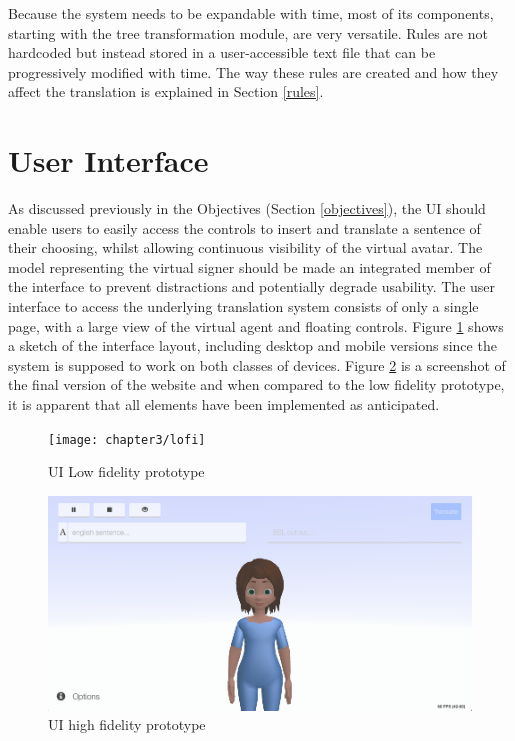 \documentclass[12pt]{ociamthesis}  %
\begin{document}
Because the system needs to be expandable with time, most of its components, starting with the tree transformation module, are very versatile. Rules are not hardcoded but instead stored in a user-accessible text file that can be progressively modified with time. The way these rules are created and how they affect the translation is explained in Section \ref{rules}.

\section{User Interface}
\label{UI}
As discussed previously in the Objectives (Section \ref{objectives}), the UI should enable users to easily access the controls to insert and translate a sentence of their choosing, whilst allowing continuous visibility of the virtual avatar. The model representing the virtual signer should be made an integrated member of the interface to prevent distractions and potentially degrade usability. The user interface to access the underlying translation system consists of only a single page, with a large view of the virtual agent and floating controls. Figure \ref{fig:lofi} shows a sketch of the interface layout, including desktop and mobile versions since the system is supposed to work on both classes of devices. Figure \ref{fig:hififull} is a screenshot of the final version of the website and when compared to the low fidelity prototype, it is apparent that all elements have been implemented as anticipated.
\begin{figure}[H]
	\centering
    \texttt{[image: chapter3/lofi]}
    \caption{UI Low fidelity prototype}
    \label{fig:lofi}
\end{figure}
\begin{figure}[H]
	\centering
    \includegraphics[scale=0.45]{chapter3/full2}
    \caption{UI high fidelity prototype}
    \label{fig:hififull}
\end{figure}
\end{document}
